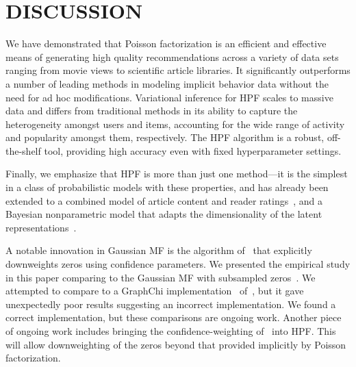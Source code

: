 \section{DISCUSSION}
\vspace{-0.1in}
We have demonstrated that Poisson factorization is an efficient and
effective means of generating high quality recommendations across a
variety of data sets ranging from movie views to scientific article
libraries. It significantly outperforms a number of leading methods in
modeling implicit behavior data without the need for ad hoc
modifications. Variational inference for HPF scales to massive data
and differs from traditional methods in its ability to capture the
heterogeneity amongst users and items, accounting for the wide range
of activity and popularity amongst them, respectively. The HPF
algorithm is a robust, off-the-shelf tool, providing high accuracy
even with fixed hyperparameter settings.

Finally, we emphasize that HPF is more than just one method---it is
the simplest in a class of probabilistic models with these properties,
and has already been extended to a combined model of article content
and reader ratings~\cite{gopalan2014content}, and a Bayesian
nonparametric model that adapts the dimensionality of the latent
representations~\cite{gopalan2014bayesian}.

A notable innovation in Gaussian MF is the algorithm
of~\cite{Hu:2008p9402} that explicitly downweights zeros using
confidence parameters. We presented the empirical study in this paper
comparing to the Gaussian MF with subsampled zeros~\cite{Koren:2009}.
We attempted to compare to a GraphChi
implementation~\cite{kyrola2012graphchi} of~\cite{Hu:2008p9402}, but
it gave unexpectedly poor results suggesting an incorrect
implementation. We found a correct implementation,
but these comparisons are ongoing work. Another piece of ongoing work
includes bringing the confidence-weighting of~\cite{Hu:2008p9402} into
HPF. This will allow downweighting of the zeros beyond that provided
implicitly by Poisson factorization.


